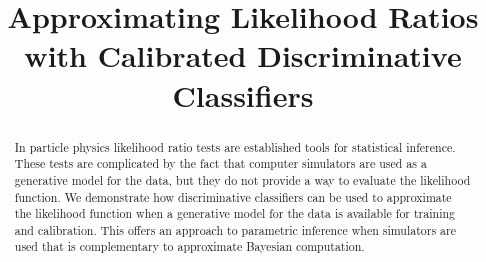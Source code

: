 \documentclass[aoas,preprint]{imsart}
\numberwithin{equation}{section}
\theoremstyle{plain}
\begin{document}
\begin{frontmatter}
\title{Approximating  Likelihood Ratios with Calibrated Discriminative Classifiers}

\begin{aug}
\author{ }



\address{Center for Cosmology and Particle Physics\\
       New York University \\
       New York, NY 10003, USA
\phantom{E-mail:\ }}
\end{aug}


\begin{abstract}%
In particle physics likelihood ratio tests are established tools for statistical inference. 
These tests are complicated by the fact that computer simulators are used as a generative model for 
the data, but they do not provide a way to evaluate the likelihood function. 
We demonstrate how discriminative classifiers can be used to approximate the likelihood function when 
a generative model for the data is available for training and calibration.  This offers an approach to parametric inference when simulators are used that is complementary to approximate Bayesian computation.
\end{abstract}

\begin{keyword}[class=MSC]
\end{keyword}

\begin{keyword}
\end{keyword}

\end{frontmatter}
\end{document}

